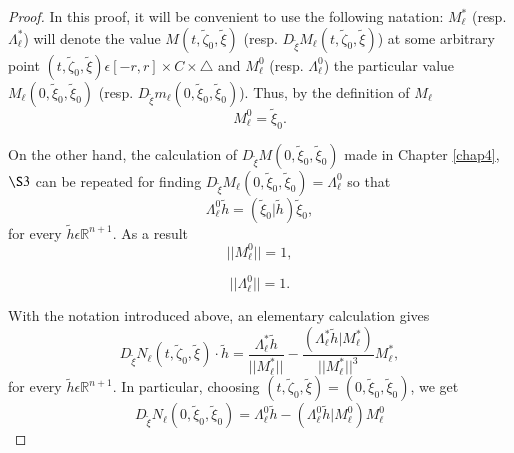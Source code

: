 \begin{proof}
In this proof, it will be convenient to use the following natation:
$M_{\ell}^{*}$ (resp. $\Lambda_{\ell}^{*}$) will denote the value
$M(t, \widetilde{\zeta}_{0}, \widetilde{\xi})$
(resp. $D_{\widetilde{\xi}}M_{\ell} (t, \widetilde{\zeta}_{0},
\widetilde{\xi})$) at some arbitrary point $(t, \widetilde{\zeta}_{0},
\widetilde{\xi}) \epsilon [-r, r] \times C \times \triangle$ and
$M_{\ell}^{0}$ (resp. $\Lambda_{\ell}^{0}$) the particular value
$M_{\ell}(0, \widetilde{\xi}_{0}, \widetilde{\xi}_{0})$
(resp. $D_{\widetilde{\xi}}m_{\ell} (0, \widetilde{\xi}_{0},
\widetilde{\xi}_{0})$). Thus, by the definition of $M_{\ell}$
\begin{equation*}
M_{\ell}^{0} = \widetilde{\xi}_{0}.\tag{A2.9}\label{app-2-eqA2.9}
\end{equation*}

On the other hand, the calculation of $D_{\widetilde{\xi}}M(0,
\widetilde{\xi}_{0}, \widetilde{\xi}_{0})$ made in Chapter
\ref{chap4}, $\S 3$ can be repeated for finding
$D_{\widetilde{\xi}}M_{\ell} (0, \widetilde{\xi}_{0},
\widetilde{\xi}_{0}) = \Lambda_{\ell}^{0}$ so that
\begin{equation*}
\Lambda_{\ell}^{0} \widetilde{h} = (\widetilde{\xi}_{0} |
\widetilde{h}) \widetilde{\xi}_{0},\tag{A2.10}\label{app-2-eqA2.10}
\end{equation*}
for every $\widetilde{h} \epsilon \mathbb{R}^{n+1}$. As a result
\begin{equation*}
||M_{\ell}^{0}|| = 1,\tag{A2.11}\label{app-2-eqA2.11}
\end{equation*}

\begin{equation*}
||\Lambda_{\ell}^{0}|| = 1.\tag{A2.12}\label{app-2-eqA2.12}
\end{equation*}\pageoriginale

With the notation introduced above, an elementary calculation gives
\begin{equation*}
D_{\widetilde{\xi}}N_{\ell} (t, \widetilde{\zeta}_{0},
\widetilde{\xi}) \cdot \widetilde{h} = \frac{\Lambda_{\ell}^{*}
  \widetilde{h}}{||M_{\ell}^{*}||} - \frac{(\Lambda_{\ell}^{*} \widetilde{h} |
  M_{\ell}^{*})}{||M_{\ell}^{*}||^{3}} M_{\ell}^{*},\tag{A2.13}\label{app-2-eqA2.13}
\end{equation*}
for every $\widetilde{h} \epsilon \mathbb{R}^{n+1}$. In particular,
choosing $(t, \widetilde{\zeta}_{0}, \widetilde{\xi}) = (0,
\widetilde{\xi}_{0}, \widetilde{\xi}_{0})$, we get
\begin{equation*}
D_{\widetilde{\xi}}N_{\ell}(0, \widetilde{\xi}_{0},
\widetilde{\xi}_{0}) = \Lambda_{\ell}^{0} \widetilde{h} -
(\Lambda_{\ell}^{0} \widetilde{h} | M_{\ell}^{0}) M_{\ell}^{0}\tag{A2.14}\label{app-2-eqA2.14}
\end{equation*}


\end{proof}
